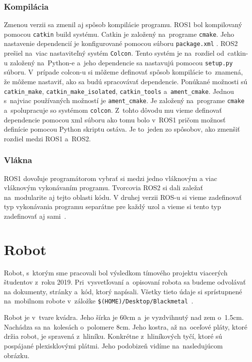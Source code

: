 \subsubsection{Kompilácia}

	Zmenou verzii sa zmenil aj spôsob kompilácie programu. ROS1 bol kompilovaný pomocou \texttt{catkin} build systému. Catkin je založený na~programe
	\texttt{cmake}. Jeho nastavenie dependencií je konfigurované pomocou súboru \texttt{package.xml} . ROS2 prešiel na~viac nastaviteľný systém \texttt{Colcon}.
	Tento systém je na~rozdiel od~catkin-u založený na~Python-e a~jeho dependencie sa nastavujú pomocou \texttt{setup.py} súboru. V~prípade colcon-u si môžeme
	definovať spôsob kompilácie to~znamená, že môžeme nastaviť, ako sa budú spracovávať dependencie. Ponúkané možnosti sú \texttt{catkin\_make},
	\texttt{catkin\_make\_isolated}, \texttt{catkin\_tools} a~\texttt{ament\_cmake}. Jednou s~najviac používaných možností je \texttt{ament\_cmake}.
	Je založený na~programe \texttt{cmake} a~spolupracuje so systémom \texttt{colcon}. Z~tohto dôvodu mu vieme definovať dependencie pomocou xml
	súboru ako tomu bolo v~ROS1 pričom možnosť definície pomocou Python skriptu ostáva. Je to~jeden zo spôsobov, ako zmenšiť rozdiel medzi ROS1 a~ROS2.

\subsubsection{Vlákna}

	ROS1 dovoľuje programátorom vybrať si medzi jedno vláknovým a viac vláknovým vykonávaním programu. Tvorcovia ROS2 si dali zaležať na~modularite
	aj tejto oblasti kódu. V druhej verzii ROS-u si vieme zadefinovať typ vykonávania programu separátne pre každý uzol a vieme si tento typ
	zadefinovať aj sami~\cite{ROS2design}.

\section{Robot}

Robot, s~ktorým sme pracovali bol výsledkom tímového projektu viacerých študentov \newline z~roku 2019. Pri~vysvetľovaní a~opisovaní robota sa budeme odvolávať
na dokumenty, stránky a~kód, ktorý napísali. Všetky tieto údaje si sprístupnené na~mobilnom robote v~záložke
\newline \texttt{\$(HOME)/Desktop/Blackmetal}~\cite{timovyProjekt}.

Robot je v~tvare kvádra. Jeho šírka je 60cm a~je vyzdvihnutý nad zem o~1.5cm. Nachádza sa na~kolesách o~polomere 8cm. Jeho kostra, až na~oceľové pláty,
ktoré držia robot, je spravená z~hliníku. Konkrétne z~hliníkových tyčí, ktoré sú pospájané plexisklovými plátmi. Jeho podobizeň vidíme na~nasledujúcom
obrázku. 


